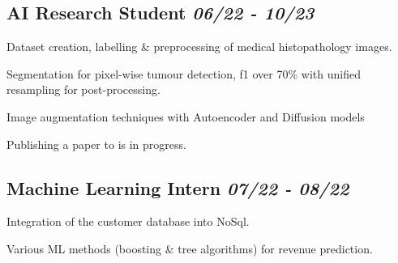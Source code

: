 \documentclass[letter, 14pt]{article}
\begin{document}
\subsection{AI Research Student \hfill \textit{\textmd{ 06/22 - 10/23}}}
\begin{zitemize}
\item Dataset creation, labelling \& preprocessing of medical histopathology images.
\item Segmentation for pixel-wise tumour detection, f1 over 70\% with unified resampling for post-processing.
\item Image augmentation techniques with Autoencoder and Diffusion models
\item Publishing a paper to \href{https://www.jidonline.org/}{\color{black}{JID Q1}} is in progress.
\end{zitemize}


\subsection{Machine Learning Intern \hfill \textit{\textmd{ 07/22 - 08/22}}}
\begin{zitemize}
\item Integration of the customer database into NoSql.
\item Various ML methods (boosting \& tree algorithms) for revenue prediction.
\end{zitemize}


\end{document}
